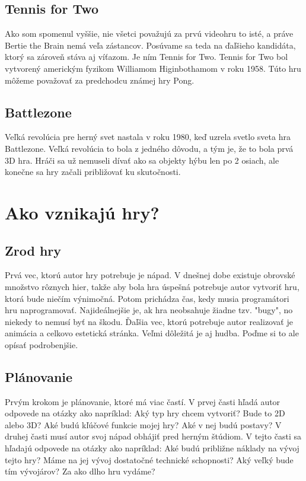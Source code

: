 \documentclass[10pt,twoside,slovak,a4paper]{article}
\begin{document}
\subsection{Tennis for Two} \label{historia:tennis}
Ako som spomenul vyššie, nie všetci považujú za prvú videohru to isté, a práve Bertie the Brain nemá veľa zástancov. Posúvame sa teda na ďaľšieho kandidáta, ktorý sa zároveň stáva aj víťazom. Je ním Tennis for Two. Tennis for Two bol vytvorený americkým fyzikom Williamom Higinbothamom v roku 1958. Túto hru môžeme považovať za predchodcu známej hry Pong.

\subsection{Battlezone} \label{historia:battlezone}
Veľká revolúcia pre herný svet nastala v roku 1980, keď uzrela svetlo sveta hra Battlezone. Veľká revolúcia to bola z jedného dôvodu, a tým je, že to bola prvá 3D hra. Hráči sa už nemuseli dívať ako sa objekty hýbu len po 2 osiach, ale konečne sa hry začali približovať ku skutočnosti.
\section{Ako vznikajú hry?} \label{pocitacove}

\subsection{Zrod hry}

Prvá vec, ktorú autor hry potrebuje je nápad. V dnešnej dobe existuje obrovské množstvo rôznych hier, takže aby bola hra úspešná potrebuje autor vytvoriť hru, ktorá bude niečím výnimočná. Potom prichádza čas, kedy musia programátori hru naprogramovať. Najideálnejšie je, ak hra neobsahuje žiadne tzv. "bugy", no niekedy to nemusí byť na škodu. Ďaľšia vec, ktorú potrebuje autor realizovať je animácia a celkovo estetická stránka. Veľmi dôležitá je aj hudba. Poďme si to ale opísať podrobenjšie.

\subsection{Plánovanie}
Prvým krokom je plánovanie, ktoré má viac častí. V prvej časti hľadá autor odpovede na otázky ako napríklad: Aký typ hry chcem vytvoriť? Bude to 2D alebo 3D? Aké budú kľúčové funkcie mojej hry? Aké v nej budú postavy? V druhej časti musí autor svoj nápad obhájiť pred herným štúdiom. V tejto časti sa hľadajú odpovede na otázky ako napríklad: Aké budú približne náklady na vývoj tejto hry? Máme na jej vývoj dostatočné technické schopnosti? Aký veľký bude tím vývojárov? Za ako dlho hru vydáme?
\end{document}
